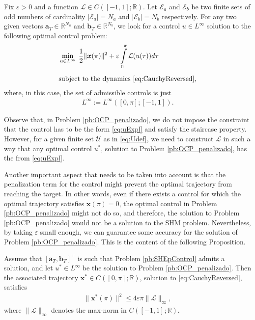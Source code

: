 \documentclass[twocolumn]{autart}    %
\begin{document}
\bigskip

\begin{problem}\label{pb:OCP_penalizado}
Fix $\varepsilon>0$ and a function $\mathcal{L}\in C([-1,1];\mathbb{R})$.  Let $\mathcal{E} _a $ and $\mathcal{E} _b $ be two finite sets of odd numbers of cardinality $|\mathcal{E}_a| = N_a $ and $ |\mathcal{E} _b| = N_b$ respectively. For any two given vectors $\bm{a}_T \in \mathbb{R}^{N_a}$ and $\bm{b}_T \in \mathbb{R}^{N_b} $, we look for a control $u\in L^\infty$ solution to the following optimal control problem:
\begin{align*}
	&\displaystyle\min_{u \in L^\infty}\;\dfrac{1}{2} \|\bm{x}(\pi)\|^2 + \varepsilon \displaystyle\int_0^\pi \mathcal{L}(u(\tau)) d\tau 
	\\[5pt] 
	&\text{subject to the dynamics \eqref{eq:CauchyReversed}},
\end{align*}
where, in this case, the set of admissible controls is just 
\begin{align*}
	L^\infty:=L^\infty ([0,\pi]; [-1,1]).
\end{align*}
\end{problem}

Observe that, in Problem \ref{pb:OCP_penalizado}, we do not impose the constraint that the control has to be the form \eqref{eq:uExpl} and satisfy the staircase property. However, for a given finite set $\mathcal{U}$ as in \eqref{eq:Udef}, we need to construct $\mathcal{L}$ in such a way that any optimal control $u^\ast$, solution to Problem \ref{pb:OCP_penalizado}, has the from \eqref{eq:uExpl}.

Another important aspect that needs to be taken into account is that the penalization term for the control might prevent the optimal trajectory from reaching the target. In other words, even if there exists a control for which the optimal trajectory satisfies $\bm{x} (\pi) = 0$, the optimal control in Problem \ref{pb:OCP_penalizado} might not do so, and therefore, the solution to Problem \ref{pb:OCP_penalizado} would not be a solution to the SHM problem. Nevertheless, by taking $\varepsilon$ small enough, we can guarantee some accuracy for the solution of Problem \ref{pb:OCP_penalizado}. This is the content of the following Proposition.

\bigskip

\begin{proposition}\label{Prop:approx controllability}
Assume that $[\bm{a}_T,\bm{b}_T]^\top$ is such that Problem \ref{pb:SHEpControl} admits a solution, and let $u^\ast\in L^\infty$ be the solution to Problem \ref{pb:OCP_penalizado}. Then the associated trajectory $\bm{x}^\ast\in C([0,\pi];\mathbb{R})$, solution to \eqref{eq:CauchyReversed}, satisfies
\begin{align*} 
	\| \bm{x}^\ast (\pi)  \|^2 \leq  4 \varepsilon \pi \| \mathcal{L}\|_\infty,
\end{align*}
where $\| \mathcal{L}\|_\infty$ denotes the max-norm in $C([-1,1]; \mathbb{R})$.
\end{proposition}
\end{document}
